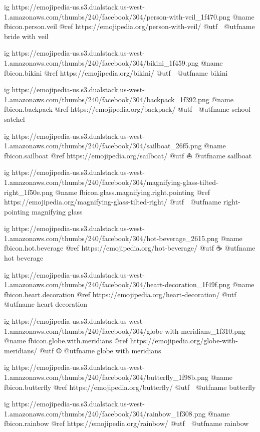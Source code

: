   ig https://emojipedia-us.s3.dualstack.us-west-1.amazonaws.com/thumbs/240/facebook/304/person-with-veil_1f470.png
  @name fbicon.person.veil
  @ref https://emojipedia.org/person-with-veil/
  @utf 👰
  @utfname bride with veil

  ig https://emojipedia-us.s3.dualstack.us-west-1.amazonaws.com/thumbs/240/facebook/304/bikini_1f459.png
  @name fbicon.bikini
  @ref https://emojipedia.org/bikini/
  @utf 👙
  @utfname bikini

  ig https://emojipedia-us.s3.dualstack.us-west-1.amazonaws.com/thumbs/240/facebook/304/backpack_1f392.png
  @name fbicon.backpack
  @ref https://emojipedia.org/backpack/
  @utf 🎒
  @utfname school satchel

  ig https://emojipedia-us.s3.dualstack.us-west-1.amazonaws.com/thumbs/240/facebook/304/sailboat_26f5.png
  @name fbicon.sailboat
  @ref https://emojipedia.org/sailboat/
  @utf ⛵
  @utfname sailboat

  ig https://emojipedia-us.s3.dualstack.us-west-1.amazonaws.com/thumbs/240/facebook/304/magnifying-glass-tilted-right_1f50e.png
  @name fbicon.glass.magnifying.right.pointing
  @ref https://emojipedia.org/magnifying-glass-tilted-right/
  @utf 🔎
  @utfname right-pointing magnifying glass

  ig https://emojipedia-us.s3.dualstack.us-west-1.amazonaws.com/thumbs/240/facebook/304/hot-beverage_2615.png
  @name fbicon.hot.beverage
  @ref https://emojipedia.org/hot-beverage/
  @utf ☕
  @utfname hot beverage

  ig https://emojipedia-us.s3.dualstack.us-west-1.amazonaws.com/thumbs/240/facebook/304/heart-decoration_1f49f.png
  @name fbicon.heart.decoration
  @ref https://emojipedia.org/heart-decoration/
  @utf 💟
  @utfname heart decoration

  ig https://emojipedia-us.s3.dualstack.us-west-1.amazonaws.com/thumbs/240/facebook/304/globe-with-meridians_1f310.png
  @name fbicon.globe.with.meridians
  @ref https://emojipedia.org/globe-with-meridians/
  @utf 🌐
  @utfname globe with meridians

  ig https://emojipedia-us.s3.dualstack.us-west-1.amazonaws.com/thumbs/240/facebook/304/butterfly_1f98b.png
  @name fbicon.butterfly
  @ref https://emojipedia.org/butterfly/
  @utf 🦋
  @utfname butterfly

  ig https://emojipedia-us.s3.dualstack.us-west-1.amazonaws.com/thumbs/240/facebook/304/rainbow_1f308.png
  @name fbicon.rainbow
  @ref https://emojipedia.org/rainbow/
  @utf 🌈
  @utfname rainbow

